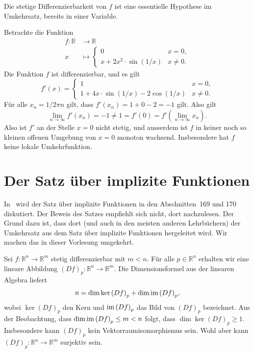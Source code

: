 \documentclass[../main.tex]{subfiles}
\begin{document}
\begin{remark}
  Die stetige Differenzierbarkeit von $f$
  ist eine essentielle Hypothese im Umkehrsatz,
  bereits in einer Variable.
\end{remark}

\begin{example}
  Betrachte die Funktion
  \begin{align*}
    f \colon \mathbb{R} & \to \mathbb{R} \\
    x & \mapsto
    \begin{cases}
      0 & x = 0, \\
      x + 2x^2 \cdot \sin(1/x) & x \neq 0.
    \end{cases}
  \end{align*}
  Die Funktion $f$ ist differenzierbar, und es gilt
  \[
    f'(x) =
    \begin{cases}
      1 & x = 0, \\
      1 + 4x \cdot \sin(1/x) - 2 \cos(1/x) & x \neq 0.
    \end{cases}
  \]
  Für alle $x_n = 1/2\pi n$ gilt, dass $f'(x_n) = 1 + 0 - 2 = -1$ gilt.
  Also gilt
  \[
    \lim_{n \to \infty} f'(x_n) = -1 \neq 1 = f'(0)
    = f' \left( \lim_{n \to \infty} x_n \right).
  \]
  Also ist $f'$ an der Stelle $x = 0$ nicht stetig, und
  ausserdem ist $f$ in keiner noch so kleinen offenen Umgebung
  von $x = 0$ monoton wachsend.
  Insbesondere hat $f$ keine lokale Umkehrfunktion.
\end{example}

\section{Der Satz über implizite Funktionen}
In~\cite{heuser} wird der Satz über implizite Funktionen
in den Abschnitten~169 und 170 diskutiert.
Der Beweis des Satzes empfiehlt sich nicht, dort nachzulesen.
Der Grund dazu ist, dass dort (und auch in den meisten
anderen Lehrbüchern) der
Umkehrsatz aus dem Satz über implizite Funktionen
hergeleitet wird. Wir machen das in dieser Vorlesung umgekehrt.

Sei $f \colon \mathbb{R}^n \to \mathbb{R}^m$
stetig differenzierbar mit $m < n$.
Für alle $p \in \mathbb{R}^n$ erhalten wir eine
lineare Abbildung ${(Df)}_p \colon \mathbb{R}^n \to \mathbb{R}^m$.
Die Dimensionsformel aus der linearen Algebra liefert
\[
  n = \dim \ker {(Df)}_p + \dim \operatorname{im} {(Df)}_p,
\]
wobei $\ker {(Df)}_p$ den Kern und
$\operatorname{im} {(Df)}_p$ das Bild von ${(Df)}_p$ bezeichnet.
Aus der Beobachtung, dass
$\dim \operatorname{im} {(Df)}_p \leq m < n$ folgt, dass
$\dim \ker {(Df)}_p \geq 1$.
Insbesondere kann ${(Df)}_p$ kein Vektorraumisomorphismus sein.
Wohl aber kann ${(Df)}_p \colon \mathbb{R}^n \to \mathbb{R}^m$
surjektiv sein.
\end{document}
